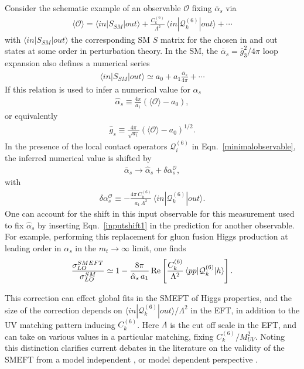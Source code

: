 \documentclass[twocolumn,nofootinbib,amsmath,amssymb,prl,aps,superscriptaddress,tightenlines,preprintnumbers]{revtex4}
\newcommand{\bea}{\begin{eqnarray}}
\newcommand{\eea}{\end{eqnarray}}
\begin{document}
Consider the schematic example of an observable $\mathcal{O}$ fixing $\bar{\alpha}_s$
via
\bea\label{minimalobservable}
\langle \mathcal{O} \rangle =  \langle in |S_{SM} | out \rangle  +
\frac{C^{(6)}_k}{\Lambda^2} \, \langle in | \mathcal{Q}^{(6)}_{k}| out \rangle + \cdots
\eea
with $ \langle in |S_{SM} | out \rangle$ the corresponding SM $S$ matrix for the chosen in and out states
at some order in perturbation theory.
In the SM, the $\bar \alpha_s= \bar{g}^2_{3}/4 \pi$ loop expansion also defines a
numerical series
\bea
\langle in | S_{SM} | out\rangle \simeq a_0 + a_1 \frac{\bar \alpha_s}{4 \pi} + \cdots
\eea
If this relation is used to infer a numerical value for $\alpha_s$
\bea
\hat \alpha_s \equiv \frac{4 \pi}{a_1}\left(\langle \mathcal{O} \rangle - a_0\right),
\eea
or equivalently
\bea
\hat g_s \equiv \frac{4 \pi}{\sqrt{a_1}}\left(\langle \mathcal{O} \rangle - a_0\right)^{1/2}.
\eea
In the presence of the local contact operators $\mathcal{Q}^{(6)}_{i}$ in Eqn.~\ref{minimalobservable},
the inferred numerical value is shifted by
\bea\label{inputshift1}
\bar \alpha_s \rightarrow \hat \alpha_s+ \delta \alpha^{\mathcal{O}}_s,
\eea
with
\bea
\delta \alpha^{\mathcal{O}}_s \equiv  - \frac{4 \pi \, C^{(6)}_k}{a_1 \, \Lambda^2} \, \langle in|\mathcal{Q}^{(6)}_{k} | out \rangle.
\eea
One can account for the shift in this input observable
for this measurement used to fix $\hat{\alpha}_s$
by inserting Eqn.~\ref{inputshift1} in the prediction for
another observable. For example, performing this replacement for gluon fusion Higgs production at leading order in $\alpha_s$ in the $m_t \rightarrow \infty$ limit, one finds
\bea\label{LOresult}
\frac{\sigma_{LO}^{SMEFT}}{\sigma_{LO}^{SM}} \simeq 1 - \frac{8 \pi}{\hat \alpha_s \, a_1} \,
{\rm Re } \left[\frac{C^{(6)}_k}{\Lambda^2} \, \langle pp |\mathcal{Q}^{(6)}_{k} | h \rangle \right].
\eea

This correction can effect global fits in the SMEFT of Higgs properties, and the size of the correction depends on
$\langle in | \mathcal{Q}^{(6)}_{k} | out \rangle/\Lambda^2$ in the EFT, in addition to the
UV matching pattern inducing $C^{(6)}_k$.
Here $\Lambda$ is the cut off scale in the EFT, and can take
on various values in a particular matching, fixing $C^{(6)}_k/M_{UV}^2$. Noting this distinction
clarifies current debates in the literature
on the validity of the SMEFT from a model independent \cite{Manohar:1983md,Manohar:1996cq,Jenkins:2013sda,Berthier:2015gja,Brivio:2017vri,Trott:2021vqa}, or model dependent perspective \cite{Contino:2016jqw,Brivio:2022pyi}.
\end{document}
